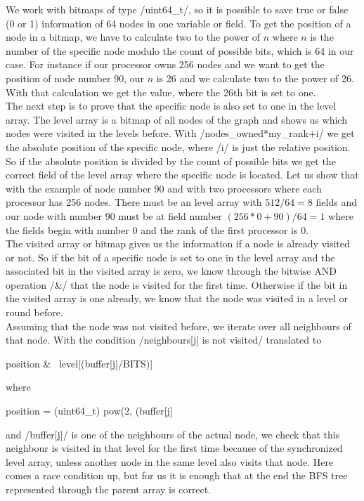\documentclass[12pt,a4paper]{article}
\begin{document}
We work with bitmaps of type \cinline/uint64_t/, so it is possible to save true or false (0 or 1) information of 64 nodes in one variable or field. To get the position of a node in a bitmap, we have to calculate two to the power of \(n\) where \(n\) is the number of the specific node modulo the count of possible bits, which is 64 in our case. For instance if our processor owns 256 nodes and we want to get the position of node number 90, our \(n\) is 26 and we calculate two to the power of 26. With that calculation we get the value, where the 26th bit is set to one.\\
The next step is to prove that the specific node is also set to one in the level array. The level array is a bitmap of all nodes of the graph and shows us which nodes were visited in the levels before. With \cinline/nodes_owned*my_rank+i/ we get the absolute position of the specific node, where \cinline/i/ is just the relative position. So if the absolute position is divided by the count of possible bits we get the correct field of the level array where the specific node is located. Let us show that with the example of node number 90 and with two processors where each processor has 256 nodes. There must be an level array with \(512/64 = 8\) fields and our node with number 90 must be at field number \((256*0+90) / 64 = 1\) where the fields begin with number 0 and the rank of the first processor is 0.\\
The visited array or bitmap gives us the information if a node is already visited or not. So if the bit of a specific node is set to one in the level array and the associated bit in the visited array is zero, we know through the bitwise AND operation \cinline/&/ that the node is visited for the first time. Otherwise if the bit in the visited array is one already, we know that the node was visited in a level or round before.\\
Assuming that the node was not visited before, we iterate over all neighbours of that node. With the condition \cinline/neighbours[j] is not visited/ translated to
\begin{ccode}
position & ~level[(buffer[j]/BITS)]
\end{ccode}
where
\begin{ccode}
position = (uint64_t) pow(2, (buffer[j] %
\end{ccode}
and \cinline/buffer[j]/ is one of the neighbours of the actual node, we check that this neighbour is visited in that level for the first time because of the synchronized level array, unless another node in the same level also visits that node. Here comes a race condition up, but for us it is enough that at the end the BFS tree represented through the parent array is correct.\\
\end{document}

